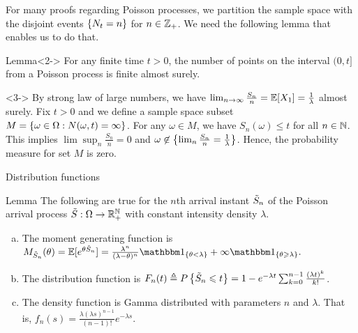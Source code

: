 \documentclass[12pt,aspectratio=169]{beamer}
\begin{document}
\begin{frame}
For many proofs regarding Poisson processes, 
we partition the sample space with the disjoint events $\left\{N_t = n\right\}$ for $n \in \mathbb{Z}_+$. 
We need the following lemma that enables us to do that. 
\begin{block}{Lemma}<2->
For any finite time $t > 0$, the number of points on the interval $(0,t]$ from a Poisson process is finite almost surely.
\end{block}

\begin{Proof}<3-> 
By strong law of large numbers, we have $\lim_{n \to \infty} \frac{S_{n}}{n} = \mathbb{E}[X_{1}] = \frac{1}{\lambda}$ almost surely. 
Fix $t > 0$ and we define a sample space subset $M = \left\{\omega \in \Omega: N(\omega, t) = \infty \right\}$. 
For any $\omega \in M$, we have $S_{n}(\omega)\le t$ for all $n \in \mathbb{N}$. 
This implies $\lim\sup_n\frac{S_{n}}{n} = 0$  and $\omega \not\in \left\{\lim_n \frac{S_{n}}{n} = \frac{1}{\lambda} \right\}$. 
Hence, the probability measure for set $M$ is zero. 
\end{Proof}
\end{frame}


\begin{frame}{Distribution functions}
\begin{block}{Lemma} 
The following are true for the $n$th arrival instant $\tilde{S}_n$ of the Poisson arrival process $\tilde{S}:\Omega\to\mathbb{R}_+^{\mathbb{N}}$ with constant intensity density $\lambda$.
\begin{enumerate}[(a)]
\item<2-> The moment generating function is 
$
M_{\tS_n}(\theta) = \E[e^{\theta \tS_n} ] = \frac{\lambda^n}{(\lambda-\theta)^n}\SetIn{\theta < \lambda} + \infty\SetIn{\theta \ge \lambda}.
$ 
\item<3-> The distribution function is  
$F_n(t) \triangleq P\left\{\tilde{S}_n \leqslant t\right\} = 1 - e^{-\lambda t}\sum_{k=0}^{n-1}\frac{(\lambda t)^k}{k!}$.
\item<4-> The density function is Gamma distributed with parameters $n$ and $\lambda$. That is, $f_{n}(s) =\frac{\lambda (\lambda s)^{n-1}} {(n-1)!} e^{-\lambda s}$. 
\end{enumerate}
\end{block}
\end{frame}
\end{document}
